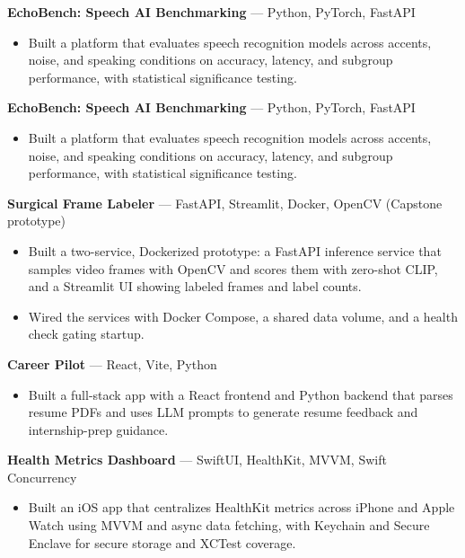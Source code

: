 \documentclass[a4paper,8pt]{extarticle}
\makeatletter
\newcommand{\v}[2]{%
  \edef\@vtmp{,\variant,}%
  \expandafter\in@\expandafter{\@vtmp}{,#1,}%
  \ifin@ #2\fi}
\makeatother
\begin{document}
\v{res}{%
\noindent
\textbf{EchoBench: Speech AI Benchmarking} --- Python, PyTorch, FastAPI
\begin{itemize}
\item Built a platform that evaluates speech recognition models across accents, noise, and speaking conditions on accuracy, latency, and subgroup performance, with statistical significance testing.
\end{itemize}
}

\v{apple}{%
\noindent
\textbf{EchoBench: Speech AI Benchmarking} --- Python, PyTorch, FastAPI
\begin{itemize}
\item Built a platform that evaluates speech recognition models across accents, noise, and speaking conditions on accuracy, latency, and subgroup performance, with statistical significance testing.
\end{itemize}
}

\v{swe}{%
\noindent
\textbf{Surgical Frame Labeler} --- FastAPI, Streamlit, Docker, OpenCV (Capstone prototype)
\begin{itemize}
\item Built a two-service, Dockerized prototype: a FastAPI inference service that samples video frames with OpenCV and scores them with zero-shot CLIP, and a Streamlit UI showing labeled frames and label counts.
\item Wired the services with Docker Compose, a shared data volume, and a health check gating startup.
\end{itemize}
\noindent
\textbf{Career Pilot} --- React, Vite, Python
\begin{itemize}
\item Built a full-stack app with a React frontend and Python backend that parses resume PDFs and uses LLM prompts to generate resume feedback and internship-prep guidance.
\end{itemize}
\noindent
\textbf{Health Metrics Dashboard} --- SwiftUI, HealthKit, MVVM, Swift Concurrency
\begin{itemize}
\item Built an iOS app that centralizes HealthKit metrics across iPhone and Apple Watch using MVVM and async data fetching, with Keychain and Secure Enclave for secure storage and XCTest coverage.
\end{itemize}
}
\end{document}
